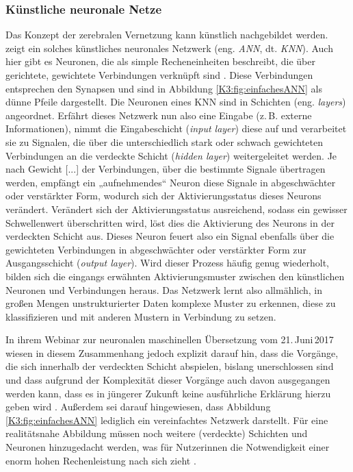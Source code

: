 \subsubsection{Künstliche neuronale Netze}
\begin{sloppypar}
Das Konzept der zerebralen Vernetzung kann künstlich nachgebildet werden.  zeigt ein solches künstliches neuronales Netzwerk (eng. \emph{ANN}, dt. \emph{KNN}). Auch hier gibt es Neuronen, die \citeauthor{kriesel_kleiner_2005} als \glqq simple Recheneinheiten\grqq{} \citep[35]{kriesel_kleiner_2005} beschreibt, die über gerichtete, gewichtete Verbindungen verknüpft sind \citep[35]{kriesel_kleiner_2005}. Diese Verbindungen entsprechen den Synapsen und sind in Abbildung \ref{K3:fig:einfachesANN} als dünne Pfeile dargestellt. Die Neuronen eines KNN sind in Schichten (eng. \emph{layers}) angeordnet. Erfährt dieses Netzwerk nun also eine Eingabe (z.\,B. externe Informationen), nimmt die Eingabeschicht (\emph{input layer}) diese auf und verarbeitet sie zu Signalen, die über die unterschiedlich stark oder schwach gewichteten Verbindungen an die verdeckte Schicht (\emph{hidden layer}) weitergeleitet werden. \glqq Je nach Gewicht [...] der Verbindungen, über die bestimmte Signale übertragen werden, empfängt ein „aufnehmendes“ Neuron diese Signale in abgeschwächter oder verstärkter Form, wodurch sich der Aktivierungsstatus dieses Neurons verändert.\grqq{} \citep[39]{kruger_von_2017} Verändert sich der Aktivierungsstatus ausreichend, sodass ein gewisser Schwellenwert überschritten wird, löst dies die Aktivierung des Neurons in der verdeckten Schicht aus. Dieses Neuron \glqq feuert\grqq{} \citep[38]{kriesel_kleiner_2005} also ein Signal ebenfalls über die gewichteten Verbindungen in abgeschwächter oder verstärkter Form zur Ausgangsschicht (\emph{output layer}). Wird dieser Prozess häufig genug wiederholt, bilden sich die eingangs erwähnten Aktivierungsmuster zwischen den künstlichen Neuronen und Verbindungen heraus. Das Netzwerk lernt also allmählich, \glqq in großen Mengen unstrukturierter Daten komplexe Muster zu erkennen, diese zu klassifizieren und mit anderen Mustern in Verbindung zu setzen.\grqq{} \citep[39]{kruger_von_2017}
\end{sloppypar}


In ihrem Webinar zur neuronalen maschinellen Übersetzung vom 21.\,Juni\,2017 wiesen \citeauthor{cattelan_introduction_2017} in diesem Zusammenhang jedoch explizit darauf hin, dass die Vorgänge, die sich innerhalb der verdeckten Schicht abspielen, bislang unerschlossen sind und dass aufgrund der Komplexität dieser Vorgänge auch davon ausgegangen werden kann, dass es in jüngerer Zukunft keine ausführliche Erklärung hierzu geben wird \citep[]{cattelan_introduction_2017}. Außerdem sei darauf hingewiesen, dass Abbildung \ref{K3:fig:einfachesANN} lediglich ein vereinfachtes Netzwerk darstellt. Für eine realitätsnahe Abbildung müssen noch weitere (verdeckte) Schichten und Neuronen hinzugedacht werden, was für Nutzer{\textperiodcentered}innen die Notwendigkeit einer enorm hohen Rechenleistung nach sich zieht \citep[39]{kruger_von_2017}.


